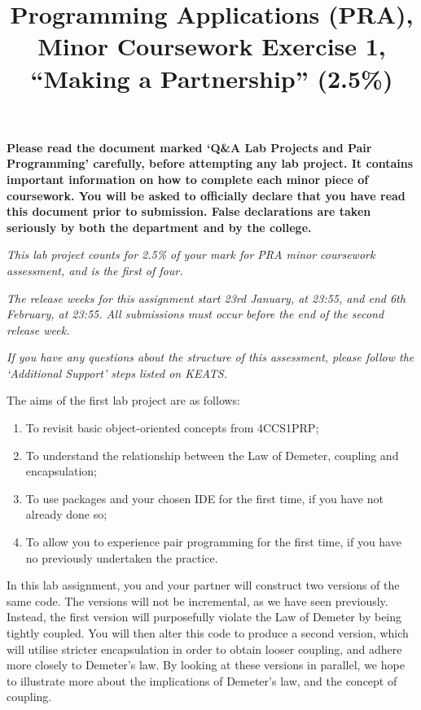 \documentclass[11pt]{article}
\title{Programming Applications (PRA), Minor Coursework Exercise 1, ``Making a Partnership'' (2.5\%)}
\date{}                                           %
\begin{document}
\maketitle

\textbf{Please read the document marked `Q\&A Lab Projects and Pair Programming' carefully, before attempting any lab project. It contains important information on how to complete each minor piece of coursework. You will be asked to officially declare that you have read this document prior to submission. False declarations are taken seriously by both the department and by the college.}

\emph{This lab project counts for 2.5\% of your mark for PRA minor coursework assessment, and is the first of four.}

\emph{The release weeks for this assignment start 23rd January, at 23:55, and end 6th February, at 23:55. All submissions must occur before the end of the second release week.}

\emph{If you have any questions about the structure of this assessment, please follow the `Additional Support' steps listed on KEATS.}

The aims of the first lab project are as follows:

\begin{enumerate}
	
	\item To revisit basic object-oriented concepts from 4CCS1PRP;
	\item To understand the relationship between the Law of Demeter, coupling and encapsulation;
	\item To use packages and your chosen IDE for the first time, if you have not already done so;
	\item To allow you to experience pair programming for the first time, if you have no previously undertaken the practice.

\end{enumerate}

In this lab assignment, you and your partner will construct two versions of the same code. The versions will not be incremental, as we have seen previously. Instead, the first version will purposefully violate the Law of Demeter by being tightly coupled. You will then alter this code to produce a second version, which will utilise stricter encapsulation in order to obtain looser coupling, and adhere more closely to Demeter's law. By looking at these versions in parallel, we hope to illustrate more about the implications of Demeter's law, and the concept of coupling.
\end{document}
